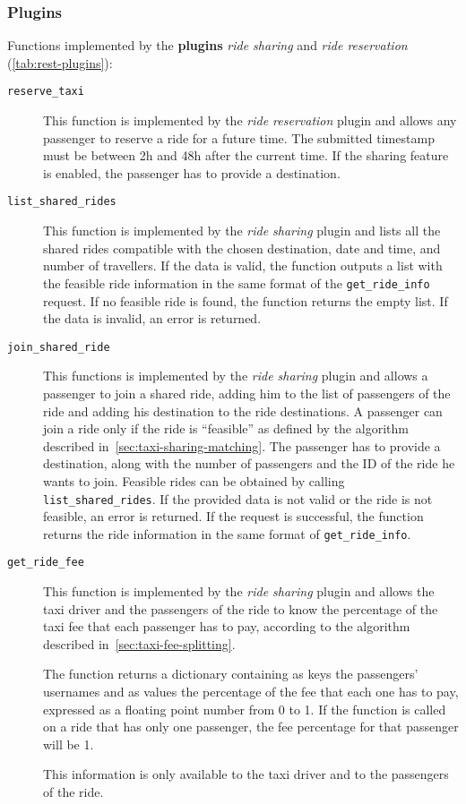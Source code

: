 \subsubsection{Plugins}
Functions implemented by the \textbf{plugins} \emph{ride sharing} and \emph{ride reservation} (\autoref{tab:rest-plugins}):
\begin{description}
    \item[\texttt{reserve\_taxi}] This function is implemented by the \emph{ride reservation} plugin and allows any passenger to reserve a ride for a future time. The submitted timestamp must be between 2h and 48h after the current time. If the sharing feature is enabled, the passenger has to provide a destination.
    \item[\texttt{list\_shared\_rides}] This function is implemented by the \emph{ride sharing} plugin and lists all the shared rides compatible with the chosen destination, date and time, and number of travellers. If the data is valid, the function outputs a list with the feasible ride information in the same format of the \texttt{get\_ride\_info} request. If no feasible ride is found, the function returns the empty list. If the data is invalid, an error is returned.
    \item[\texttt{join\_shared\_ride}] This functions is implemented by the \emph{ride sharing} plugin and allows a passenger to join a shared ride, adding him to the list of passengers of the ride and adding his destination to the ride destinations. A passenger can join a ride only if the ride is ``feasible'' as defined by the algorithm described in~\autoref{sec:taxi-sharing-matching}. The passenger has to provide a destination, along with the number of passengers and the ID of the ride he wants to join. Feasible rides can be obtained by calling \texttt{list\_shared\_rides}. If the provided data is not valid or the ride is not feasible, an error is returned. If the request is successful, the function returns the ride information in the same format of \texttt{get\_ride\_info}.

    \item[\texttt{get\_ride\_fee}] This function is implemented by the \emph{ride sharing} plugin and allows the taxi driver and the passengers of the ride to know the percentage of the taxi fee that each passenger has to pay, according to the algorithm described in~\autoref{sec:taxi-fee-splitting}.

    The function returns a dictionary containing as keys the passengers' usernames and as values the percentage of the fee that each one has to pay, expressed as a floating point number from 0 to 1. If the function is called on a ride that has only one passenger, the fee percentage for that passenger will be 1.

    This information is only available to the taxi driver and to the passengers of the ride.
\end{description}

